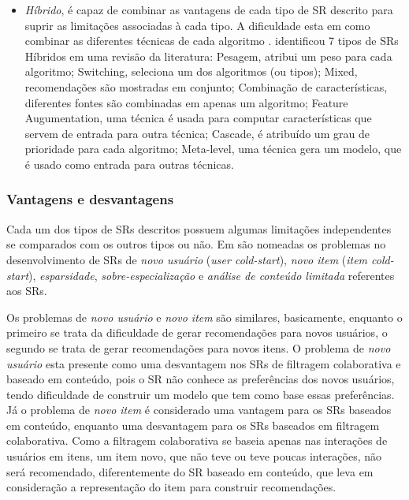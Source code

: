 \documentclass[normaltoc, espacoumemeio, pnumromarab,ruledheader]{abnt}
\begin{document}
\begin{itemize}
 \item \textit{Híbrido}, é capaz de combinar as vantagens de cada tipo de SR descrito para suprir as limitações associadas à cada tipo. A dificuldade esta em como combinar as diferentes técnicas de cada algoritmo \cite{Jannach2011,Burke2007}.  identificou 7 tipos de SRs Híbridos em uma revisão da literatura: Pesagem, atribui um peso para cada algoritmo; Switching, seleciona um dos algoritmos (ou tipos); Mixed, recomendações são mostradas em conjunto; Combinação de características, diferentes fontes são combinadas em apenas um algoritmo; Feature Augumentation, uma técnica é usada para computar características que servem de entrada para outra técnica; Cascade, é atribuído um grau de prioridade para cada algoritmo; Meta-level, uma técnica gera um modelo, que é usado como entrada para outras técnicas.
\end{itemize}

 \subsubsection{Vantagens e desvantagens}
 \label{subsubsec:lim}

Cada um dos tipos de SRs descritos possuem algumas limitações independentes se comparados com os outros tipos ou não.
Em  são nomeadas os problemas no desenvolvimento de SRs de \textit{novo usuário} (\textit{user cold-start}), \textit{novo item} (\textit{item cold-start}), \textit{esparsidade}, \textit{sobre-especialização} e \textit{análise de conteúdo limitada} referentes aos SRs.

Os problemas de \textit{novo usuário} e \textit{novo item} são similares, basicamente, enquanto o primeiro se trata da dificuldade de gerar recomendações para novos usuários, o segundo se trata de gerar recomendações para novos itens.
O problema de \textit{novo usuário} esta presente como uma desvantagem nos SRs de filtragem colaborativa e baseado em conteúdo, pois o SR não conhece as preferências dos novos usuários, tendo dificuldade de construir um modelo que tem como base essas preferências.
Já o problema de \textit{novo item} é considerado uma vantagem para os SRs baseados em conteúdo, enquanto uma desvantagem para os SRs baseados em filtragem colaborativa.
Como a filtragem colaborativa se baseia apenas nas interações de usuários em itens, um item novo, que não teve ou teve poucas interações, não será recomendado, diferentemente do SR baseado em conteúdo, que leva em consideração a representação do item para construir recomendações.
\end{document}
